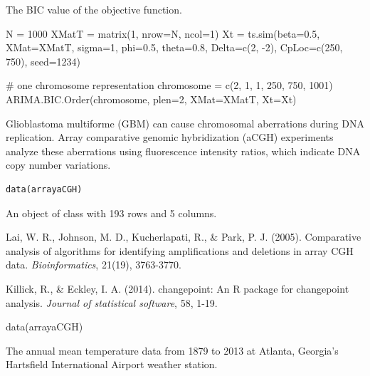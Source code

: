 \documentclass[a4paper]{book}
\begin{document}
%
\begin{Value}
The BIC value of the objective function.
\end{Value}
%
\begin{Examples}
\begin{ExampleCode}
N = 1000
XMatT = matrix(1, nrow=N, ncol=1)
Xt = ts.sim(beta=0.5, XMat=XMatT, sigma=1, phi=0.5, theta=0.8,
            Delta=c(2, -2), CpLoc=c(250, 750), seed=1234)

# one chromosome representation
chromosome = c(2, 1, 1, 250, 750, 1001)
ARIMA.BIC.Order(chromosome, plen=2, XMat=XMatT, Xt=Xt)
\end{ExampleCode}
\end{Examples}
%
\begin{Description}
Glioblastoma multiforme (GBM) can cause chromosomal aberrations during DNA
replication. Array comparative genomic hybridization (aCGH) experiments analyze
these aberrations using fluorescence intensity ratios, which indicate DNA copy
number variations.
\end{Description}
%
\begin{Usage}
\begin{verbatim}
data(arrayaCGH)
\end{verbatim}
\end{Usage}
%
\begin{Format}
An object of class  with 193 rows and 5 columns.
\end{Format}
%
\begin{References}
Lai, W. R., Johnson, M. D., Kucherlapati, R., \& Park, P. J. (2005).
Comparative analysis of algorithms for identifying amplifications and deletions
in array CGH data. \emph{Bioinformatics}, 21(19), 3763-3770.

Killick, R., \& Eckley, I. A. (2014). changepoint: An R package for
changepoint analysis. \emph{Journal of statistical software}, 58, 1-19.
\end{References}
%
\begin{Examples}
\begin{ExampleCode}
data(arrayaCGH)
\end{ExampleCode}
\end{Examples}
%
\begin{Description}
The annual mean temperature data from 1879 to 2013 at Atlanta, Georgia’s
Hartsfield International Airport weather station.
\end{Description}
\end{document}
